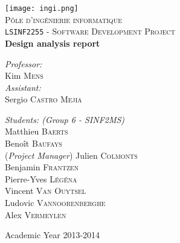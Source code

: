 \begin{titlepage}

\rm %

\begin{center}

\texttt{[image: ingi.png]}\\[2cm]

\textsc{\LARGE Pôle d'ingénierie informatique}\\[1.5cm]

\textsc{\Large \texttt{LSINF2255} - Software Development Project}\\[0.5cm]


\vspace{3.5cm}
{ \huge \bfseries Design analysis report\vspace{0.8cm}}

\vspace{3.5cm}

\begin{minipage}{0.4\textwidth}
\begin{flushleft} \large
\emph{Professor:}\\
	Kim \textsc{Mens}\\
\vspace{1cm}
\emph{Assistant:}\\
	Sergio \textsc{Castro Mejia} %
\end{flushleft}
\end{minipage}
\begin{minipage}{0.4\textwidth}
\begin{flushright} \large
\emph{Students: (Group 6 - SINF2MS)} \\
	Matthieu \textsc{Baerts}\\
	Benoît \textsc{Baufays}\\
	(\textit{Project Manager}) Julien \textsc{Colmonts}\\
	Benjamin \textsc{Frantzen}\\
	Pierre-Yves \textsc{Légéna}\\
	Vincent \textsc{Van Ouytsel}\\
	Ludovic \textsc{Vannoorenberghe}\\
	Alex \textsc{Vermeylen}
\end{flushright}
\end{minipage}

\vfill

{\large Academic Year 2013-2014}
\end{center}

\end{titlepage}
\restoregeometry
